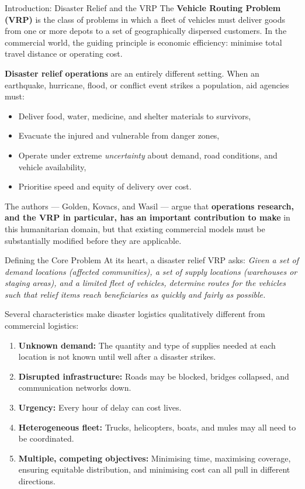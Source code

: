 \documentclass[aspectratio=169,10pt]{beamer}
\begin{document}
\begin{frame}[allowframebreaks]{Introduction: Disaster Relief and the VRP}
  The \textbf{Vehicle Routing Problem (VRP)} is the class of problems in
  which a fleet of vehicles must deliver goods from one or more depots to
  a set of geographically dispersed customers.
  In the commercial world, the guiding principle is economic efficiency:
  minimise total travel distance or operating cost.

  \medskip
  \textbf{Disaster relief operations} are an entirely different setting.
  When an earthquake, hurricane, flood, or conflict event strikes a
  population, aid agencies must:
  \begin{itemize}
    \item Deliver food, water, medicine, and shelter materials to survivors,
    \item Evacuate the injured and vulnerable from danger zones,
    \item Operate under extreme \emph{uncertainty} about demand, road
          conditions, and vehicle availability,
    \item Prioritise speed and equity of delivery over cost.
  \end{itemize}

  \medskip
  The authors --- Golden, Kovacs, and Wasil --- argue that
  \textbf{operations research, and the VRP in particular, has an important
  contribution to make} in this humanitarian domain, but that existing
  commercial models must be substantially modified before they are
  applicable.

  \framebreak

  \begin{block}{Defining the Core Problem}
    At its heart, a disaster relief VRP asks:
    \emph{Given a set of demand locations (affected communities),
    a set of supply locations (warehouses or staging areas),
    and a limited fleet of vehicles, determine routes for the vehicles
    such that relief items reach beneficiaries as quickly and fairly
    as possible.}
  \end{block}

  \medskip
  Several characteristics make disaster logistics qualitatively different
  from commercial logistics:
  \begin{enumerate}
    \item \textbf{Unknown demand:} The quantity and type of supplies
          needed at each location is not known until well after a disaster
          strikes.
    \item \textbf{Disrupted infrastructure:} Roads may be blocked,
          bridges collapsed, and communication networks down.
    \item \textbf{Urgency:} Every hour of delay can cost lives.
    \item \textbf{Heterogeneous fleet:} Trucks, helicopters, boats,
          and mules may all need to be coordinated.
    \item \textbf{Multiple, competing objectives:} Minimising time,
          maximising coverage, ensuring equitable distribution, and
          minimising cost can all pull in different directions.
  \end{enumerate}


\end{frame}
\end{document}
